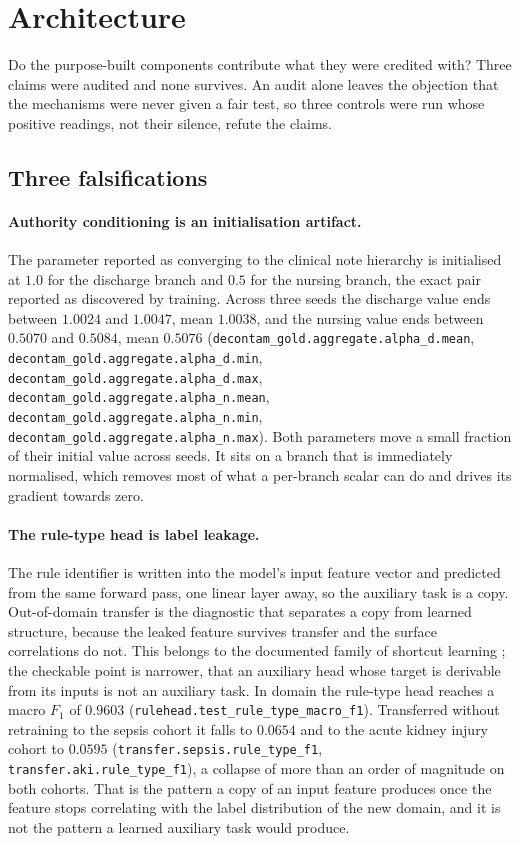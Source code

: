 \section{Architecture}
\label{sec:res-rq3}

Do the purpose-built components contribute what they were credited with? Three
claims were audited and none survives. An audit alone leaves the objection that
the mechanisms were never given a fair test, so three controls were run whose
positive readings, not their silence, refute the claims.

\subsection{Three falsifications}

\paragraph{Authority conditioning is an initialisation artifact.} The parameter
reported as converging to the clinical note hierarchy is initialised at $1.0$
for the discharge branch and $0.5$ for the nursing branch, the exact pair
reported as discovered by training. Across three seeds the discharge value
ends between $1.0024$ and $1.0047$, mean $1.0038$, and the nursing value ends
between $0.5070$ and $0.5084$, mean $0.5076$
(\texttt{decontam\_gold.aggregate.alpha\_d.mean},
\texttt{decontam\_gold.aggregate.alpha\_d.min},
\texttt{decontam\_gold.aggregate.alpha\_d.max},
\texttt{decontam\_gold.aggregate.alpha\_n.mean},
\texttt{decontam\_gold.aggregate.alpha\_n.min},
\texttt{decontam\_gold.aggregate.alpha\_n.max}). Both parameters move a small
fraction of their initial value across seeds. It sits on a branch that is
immediately normalised, which removes most of what a per-branch scalar can do
and drives its gradient towards zero.

\paragraph{The rule-type head is label leakage.} The rule identifier is written
into the model's input feature vector and predicted from the same forward pass,
one linear layer away, so the auxiliary task is a copy. Out-of-domain transfer is
the diagnostic that separates a copy from learned structure, because the leaked
feature survives transfer and the surface correlations do not. This belongs to
the documented family of shortcut learning \citep{geirhos2020shortcut,
zech2018generalization}; the checkable point is narrower, that an auxiliary head
whose target is derivable from its inputs is not an auxiliary task. In domain the
rule-type head reaches a macro $F_1$ of $0.9603$
(\texttt{rulehead.test\_rule\_type\_macro\_f1}). Transferred without retraining
to the sepsis cohort it falls to $0.0654$ and to the acute kidney injury cohort
to $0.0595$ (\texttt{transfer.sepsis.rule\_type\_f1},
\texttt{transfer.aki.rule\_type\_f1}), a collapse of more than an order of
magnitude on both cohorts. That is the pattern a copy of an input feature
produces once the feature stops correlating with the label distribution of the
new domain, and it is not the pattern a learned auxiliary task would produce.

